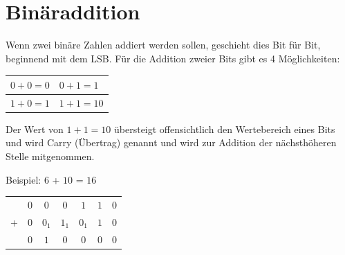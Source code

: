 \documentclass[a4paper,10pt]{report}
\begin{document}
\section{Binäraddition}
Wenn zwei binäre Zahlen addiert werden sollen, geschieht dies Bit für Bit, beginnend mit dem LSB. Für die Addition zweier Bits gibt es 4 Möglichkeiten:
	\begin{center}
		\begin{tabular}{l|l}
			$0+0=0$&$0+1 =1$ \\ \hline
			$1+0 = 1$ & $1+1 = 10$ \\
		\end{tabular}
		\end{center}
Der Wert von $1+1=10$ übersteigt offensichtlich den Wertebereich eines Bits und wird Carry (Übertrag) genannt und wird zur Addition der nächsthöheren Stelle mitgenommen. 

Beispiel: $6$ + $10$ = $16$
\begin{center}\begin{tabular}{ccccccc}
& $0$ & $0$ & $0$ & $1$ & $1$ & $0$ \\
+ & $0$ & $0_1$ & $1_1$ & $0_1$ & $1$ & $0$ \\ \hline
& $0$ & $1$ & $0$ & $0$ & $0$ & $0$ \\ \hline \hline
\end{tabular}\end{center}
\end{document}
